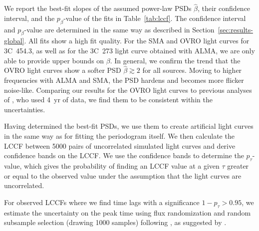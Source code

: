 \documentclass[twocolumn]{aastex62}
\begin{document}
We report the best-fit slopes of the assumed power-law PSDs $\hat{\beta}$, their confidence interval, and the $p_\beta$-value of the fits in Table~\ref{tab:lccf}.
The confidence interval and $p_\beta$-value are determined in the same way as described in Section~\ref{sec:results-global}.
All fits show a high fit quality. 
For the SMA and OVRO light curves for 3C~454.3, as well as for the 3C~273 light curve obtained with ALMA, we are only able to provide upper bounds on $\beta$.
In general, we confirm the trend that the OVRO light curves show a softer PSD $\hat{\beta} \gtrsim 2$ for all sources. 
Moving to higher frequencies with ALMA and SMA, the PSD hardens and becomes more flicker noise-like. 
Comparing our results for the OVRO light curves to previous analyses of \citet{2014MNRAS.445..428M}, who used 4~yr of data, we find them to be consistent within the uncertainties. 

Having determined the best-fit PSDs, we use them to create artificial light curves in the same way as for fitting the periodogram itself.
We then calculate the LCCF between 5000 pairs of uncorrelated simulated light curves and derive confidence bands on the LCCF. We use the confidence bands to determine the $p_\tau$-value, which gives the probability of finding an LCCF value at a given $\tau$ greater or equal to the observed value under the assumption that the light curves are uncorrelated. 

For observed LCCFs where we find time lags with a significance $1 - p_\tau > 0.95$, we estimate the uncertainty on the peak time using flux randomization and random subsample selection (drawing 1000 samples) following \citet{1998PASP..110..660P}, as suggested by \citet{2014MNRAS.445..437M}.
\end{document}

